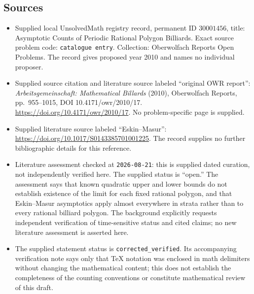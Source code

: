 \documentclass[11pt]{article}
\begin{document}
\subsection{Sources}
\begin{itemize}
\item Supplied local UnsolvedMath registry record, permanent ID \(30001456\), title: Asymptotic Counts of Periodic Rational Polygon Billiards. Exact source problem code: \texttt{catalogue entry}. Collection: Oberwolfach Reports Open Problems. The record gives proposed year 2010 and names no individual proposer.
\item Supplied source citation and literature source labeled ``original OWR report'': \emph{Arbeitsgemeinschaft: Mathematical Billards} (2010), Oberwolfach Reports, pp.~955--1015, DOI 10.4171/owr/2010/17. \url{https://doi.org/10.4171/owr/2010/17}. No problem-specific page is supplied.
\item Supplied literature source labeled ``Eskin--Masur'': \url{https://doi.org/10.1017/S0143385701001225}. The record supplies no further bibliographic details for this reference.
\item Literature assessment checked at \texttt{2026-08-21}: this is supplied dated curation, not independently verified here. The supplied status is ``open.'' The assessment says that known quadratic upper and lower bounds do not establish existence of the limit for each fixed rational polygon, and that Eskin--Masur asymptotics apply almost everywhere in strata rather than to every rational billiard polygon. The background explicitly requests independent verification of time-sensitive status and cited claims; no new literature assessment is asserted here.
\item The supplied statement status is \texttt{corrected\_verified}. Its accompanying verification note says only that TeX notation was enclosed in math delimiters without changing the mathematical content; this does not establish the completeness of the counting conventions or constitute mathematical review of this draft.
\end{itemize}
\end{document}

